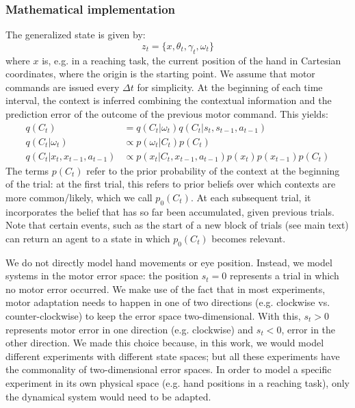 \documentclass[a4paper,doc,floatsintext,natbib]{apa6}
\begin{document}
\subsubsection{Mathematical implementation}
The generalized state is given by:
\begin{equation}
z_t = \{x, \theta_t, \gamma_t, \omega_t\}
\end{equation}
where $x$ is, e.g. in a reaching task, the current position of the hand in
Cartesian coordinates, where the origin is the starting point. We assume that
motor commands are issued every $\Delta t$ for simplicity. At the beginning of
each time interval, the context is inferred combining the contextual
information and the prediction error of the outcome of the previous motor
command. This yields:
\begin{align}
  q(C_t) &= q(C_t | \omega_t)q(C_t | s_t, s_{t-1}, a_{t-1}) \\ \label{eqn:estimated-context}
  q(C_t | \omega_t) &\propto p(\omega_t | C_t)p(C_t) \\
  q(C_t | x_t, x_{t-1}, a_{t-1}) &\propto p(x_t | C_t, x_{t-1}, a_{t-1})p(x_t)p(x_{t-1})p(C_t)
\end{align}
The terms $p(C_t)$ refer to the prior probability of the context at the
beginning of the trial: at the first trial, this refers to prior beliefs over
which contexts are more common/likely, which we call $p_0(C_t)$. At each
subsequent trial, it incorporates the belief that has so far been accumulated,
given previous trials. Note that certain events, such as the start of a new
block of trials (see main text) can return an agent to a state in which
$p_0(C_t)$ becomes relevant.

We do not directly model hand movements or eye position. Instead, we model
systems in the motor error space: the position $s_t = 0$ represents a trial in
which no motor error occurred. We make use of the fact that in most
experiments, motor adaptation needs to happen in one of two directions
(e.g. clockwise vs. counter-clockwise) to keep the error space
two-dimensional. With this, $s_t > 0$ represents motor error in one direction
(e.g. clockwise) and $s_t < 0$, error in the other direction. We made this
choice because, in this work, we would model different experiments with
different state spaces; but all these experiments have the commonality of
two-dimensional error spaces. In order to model a specific experiment in its
own physical space (e.g. hand positions in a reaching task), only the dynamical
system would need to be adapted.
\end{document}

